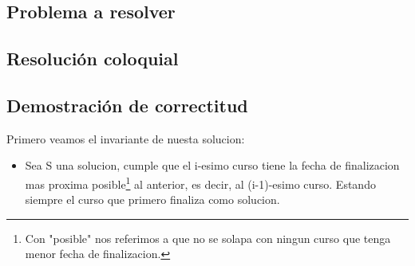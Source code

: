 \subsection{Problema a resolver}


\subsection{Resolución coloquial}


\subsection{Demostración de correctitud}

Primero veamos el invariante de nuesta solucion:
\begin{itemize}
\item Sea S una solucion, cumple que el i-esimo curso tiene la fecha de finalizacion mas proxima posible\footnote{Con "posible" nos referimos a que no se solapa con ningun curso que tenga menor fecha de finalizacion.} al anterior, es decir, al (i-1)-esimo curso. Estando siempre el curso que primero finaliza como solucion.
\end{itemize}

